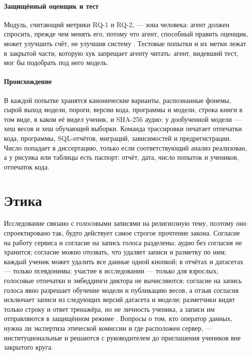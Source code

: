 \paragraph{Защищённый оценщик и тест} Модуль, считающий метрики RQ-1 и RQ-2, --- зона человека: агент должен
спросить, прежде чем менять его, потому что агент, способный править оценщик, может улучшить счёт, не
улучшив систему \cite{SRC-027,SRC-082}. Тестовые попытки и их метки лежат в закрытой части, которую хук запрещает агенту читать: агент,
видевший тест, мог бы подобрать под него модель.

\paragraph{Происхождение} В каждой попытке хранятся канонические варианты, распознанные фонемы, сырой
выход модели, пороги, версии кода, программы и модели, строка книги в том виде, в каком её видел ученик, и
SHA-256 аудио; у дообученной модели --- хеш весов и хеш обучающей выборки. Команда трассировки печатает отпечатки кода, программы, SQL-отчётов, миграций, зависимостей
и предрегистрации. Число попадает в диссертацию, только если соответствующий анализ реализован, а у рисунка
или таблицы есть паспорт: отчёт, дата, число попыток и учеников, отпечаток кода.

\section{Этика}\label{sec:method-ethics}

Исследование связано с голосовыми записями на религиозную тему, поэтому оно спроектировано так, будто
действует самое строгое прочтение закона. Согласие на работу сервиса и согласие на запись голоса
разделены; аудио без согласия не хранится; согласие можно отозвать, что удаляет записи и разметку по ним;
каждый ученик может удалить все данные одной кнопкой; в отчётах и датасетах --- только псевдонимы;
участие в исследовании --- только для взрослых; голосовые отпечатки и эмбеддинги диктора не вычисляются;
согласие на запись голоса явно разрешает обучение модели и публикацию весов, а отзыв согласия исключает
записи из следующих версий датасета и модели;
разметчики видят только строку и ответ тренажёра, но не личность ученика, а записи им отправляются в
защищённом режиме \cite{SRC-033,SRC-036,SRC-037}. Вопросы о том, кто оператор данных, нужна ли
экспертиза этической комиссии и где расположен сервер, --- институциональные и решаются с руководителем до
приглашения учеников вне закрытого круга.

